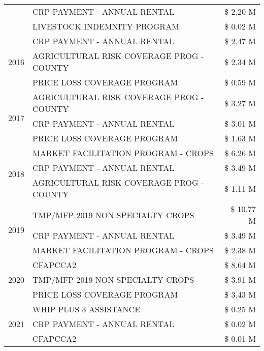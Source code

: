 \begin{tabular}{llr}
 & CRP PAYMENT - ANNUAL RENTAL & \$ 2.20 M \\
 & LIVESTOCK INDEMNITY PROGRAM & \$ 0.02 M \\
\cline{1-3}
\multirow[t]{3}{*}{2016} & CRP PAYMENT - ANNUAL RENTAL & \$ 2.47 M \\
 & AGRICULTURAL RISK COVERAGE PROG - COUNTY & \$ 2.34 M \\
 & PRICE LOSS COVERAGE PROGRAM & \$ 0.59 M \\
\cline{1-3}
\multirow[t]{3}{*}{2017} & AGRICULTURAL RISK COVERAGE PROG - COUNTY & \$ 3.27 M \\
 & CRP PAYMENT - ANNUAL RENTAL & \$ 3.01 M \\
 & PRICE LOSS COVERAGE PROGRAM & \$ 1.63 M \\
\cline{1-3}
\multirow[t]{3}{*}{2018} & MARKET FACILITATION PROGRAM - CROPS & \$ 6.26 M \\
 & CRP PAYMENT - ANNUAL RENTAL & \$ 3.49 M \\
 & AGRICULTURAL RISK COVERAGE PROG - COUNTY & \$ 1.11 M \\
\cline{1-3}
\multirow[t]{3}{*}{2019} & TMP/MFP 2019 NON SPECIALTY CROPS & \$ 10.77 M \\
 & CRP PAYMENT - ANNUAL RENTAL & \$ 3.49 M \\
 & MARKET FACILITATION PROGRAM - CROPS & \$ 2.38 M \\
\cline{1-3}
\multirow[t]{3}{*}{2020} & CFAPCCA2 & \$ 8.64 M \\
 & TMP/MFP 2019 NON SPECIALTY CROPS & \$ 3.91 M \\
 & PRICE LOSS COVERAGE PROGRAM & \$ 3.43 M \\
\cline{1-3}
\multirow[t]{3}{*}{2021} & WHIP PLUS 3 ASSISTANCE & \$ 0.25 M \\
 & CRP PAYMENT - ANNUAL RENTAL & \$ 0.02 M \\
 & CFAPCCA2 & \$ 0.01 M \\
\cline{1-3}
\bottomrule
\end{tabular}
